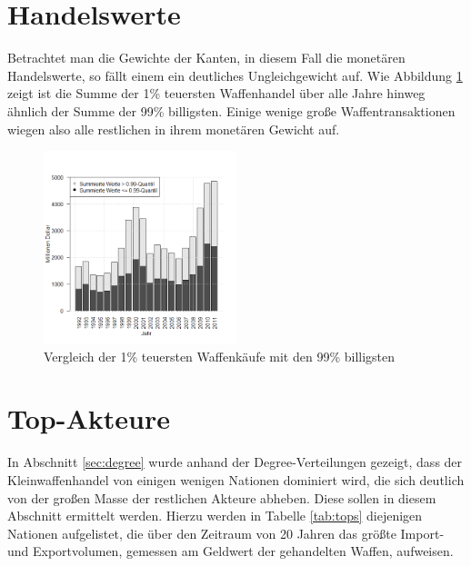 \documentclass[a4paper,ngerman,oneside,titlepage,bibliography=totoc,11pt]{scrreprt}
\begin{document}
\section{Handelswerte}


Betrachtet man die Gewichte der Kanten, in diesem Fall die monetären Handelswerte, so fällt einem ein deutliches Ungleichgewicht auf. Wie Abbildung \ref{fig:ts_value} zeigt ist die Summe der 1\% teuersten Waffenhandel über alle Jahre hinweg ähnlich der Summe der 99\% billigsten. Einige wenige große Waffentransaktionen wiegen also alle restlichen in ihrem monetären Gewicht auf. 
\begin{figure}[ht]
	\centering
		\includegraphics[width=0.5\textwidth]{Grafiken/ts_value.png}
	\caption{Vergleich der 1\% teuersten Waffenkäufe mit den 99\% billigsten}
	\label{fig:ts_value}
\end{figure}

\section{Top-Akteure}
\label{sec:top-akteure}
In Abschnitt \ref{sec:degree} wurde anhand der Degree-Verteilungen gezeigt, dass der Kleinwaffenhandel von einigen wenigen Nationen dominiert wird, die sich deutlich von der großen Masse der restlichen Akteure abheben. Diese sollen in diesem Abschnitt ermittelt werden. Hierzu werden in Tabelle \ref{tab:tops} diejenigen Nationen aufgelistet, die über den Zeitraum von 20 Jahren das größte Import- und Exportvolumen, gemessen am Geldwert der gehandelten Waffen, aufweisen. 
\end{document}
